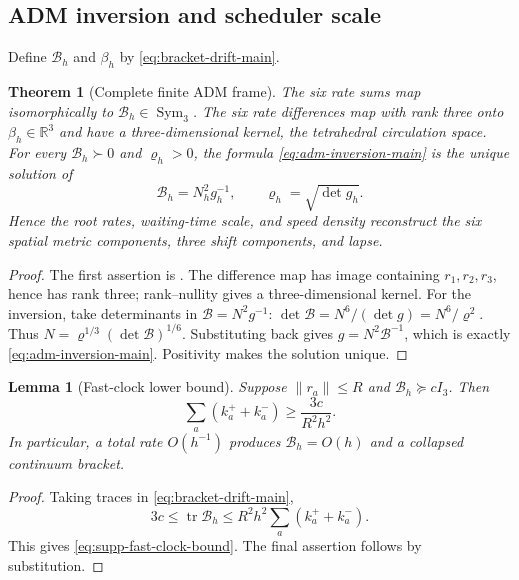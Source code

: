 \documentclass[11pt]{article}
\newtheorem{theorem}{Theorem}[section]
\newtheorem{lemma}[lemma]{Lemma}
\theoremstyle{definition}
\theoremstyle{remark}
\newcommand{\R}{\mathbb R}
\newcommand{\tr}{\operatorname{tr}}
\newcommand{\norm}[1]{\lVert#1\rVert}
\newcommand{\Sym}{\operatorname{Sym}}
\begin{document}
\subsection{ADM inversion and scheduler scale}

Define $\mathcal B_h$ and $\beta_h$ by
\eqref{eq:bracket-drift-main}.

\begin{theorem}[Complete finite ADM frame]
\label{thm:supp-adm-frame}
The six rate sums map isomorphically to $\mathcal B_h\in\Sym_3$.  The six rate
differences map with rank three onto $\beta_h\in\R^3$ and have a
three-dimensional kernel, the tetrahedral circulation space.  For every
$\mathcal B_h\succ0$ and $\varrho_h>0$, the formula
\eqref{eq:adm-inversion-main} is the unique solution of
\begin{equation}
 \mathcal B_h=N_h^2g_h^{-1},
 \qquad
 \varrho_h=\sqrt{\det g_h}.
 \label{eq:supp-adm-characterization}
\end{equation}
Hence the root rates, waiting-time scale, and speed density reconstruct the six
spatial metric components, three shift components, and lapse.
\end{theorem}

\begin{proof}
The first assertion is .  The difference map has
image containing $r_1,r_2,r_3$, hence has rank three; rank--nullity gives a
three-dimensional kernel.  For the inversion, take determinants in
$\mathcal B=N^2g^{-1}$:
$\det\mathcal B=N^6/(\det g)=N^6/\varrho^2$.  Thus
$N=\varrho^{1/3}(\det\mathcal B)^{1/6}$.  Substituting back gives
$g=N^2\mathcal B^{-1}$, which is exactly
\eqref{eq:adm-inversion-main}.  Positivity makes the solution unique.
\end{proof}

\begin{lemma}[Fast-clock lower bound]
\label{lem:supp-fast-clock}
Suppose $\norm{r_a}\le R$ and $\mathcal B_h\succeq cI_3$.  Then
\begin{equation}
 \sum_a(k_a^++k_a^-)\ge\frac{3c}{R^2h^2}.
 \label{eq:supp-fast-clock-bound}
\end{equation}
In particular, a total rate $O(h^{-1})$ produces $\mathcal B_h=O(h)$ and a
collapsed continuum bracket.
\end{lemma}

\begin{proof}
Taking traces in \eqref{eq:bracket-drift-main},
\[
 3c\le\tr\mathcal B_h
 \le R^2h^2\sum_a(k_a^++k_a^-).
\]
This gives \eqref{eq:supp-fast-clock-bound}.  The final assertion follows by
substitution.
\end{proof}
\end{document}
